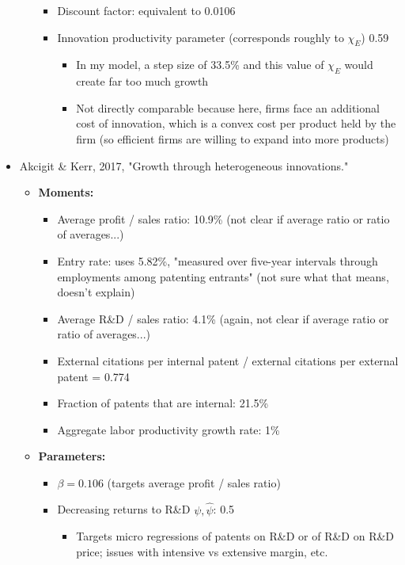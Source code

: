 \documentclass[12pt,english]{article}
\theoremstyle{remark}
\begin{document}
\begin{itemize}
\begin{itemize}
\begin{itemize}
			\item Discount factor: equivalent to 0.0106
			\item Innovation productivity parameter (corresponds roughly to $\chi_E$) 0.59
			\begin{itemize}
				\item In my model, a step size of 33.5\% and this value of $\chi_E$ would create far too much growth
				\item Not directly comparable because here, firms face an additional cost of innovation, which is a convex cost per product held by the firm (so efficient firms are willing to expand into more products)
			\end{itemize}
		\end{itemize}
	\end{itemize}
	\item Akcigit \& Kerr, 2017, "Growth through heterogeneous innovations."
	\begin{itemize}
		\item \textbf{Moments:}
		\begin{itemize}
			\item Average profit / sales ratio: 10.9\% (not clear if average ratio or ratio of averages...)
			\item Entry rate: uses 5.82\%, "measured over five-year intervals through employments among patenting entrants" (not sure what that means, doesn't explain)
			\item Average R\&D / sales ratio: 4.1\% (again, not clear if average ratio or ratio of averages...)
			\item External citations per internal patent / external citations per external patent = 0.774
			\item Fraction of patents that are internal: 21.5\%
			\item Aggregate labor productivity growth rate: 1\%
		\end{itemize}
		\item \textbf{Parameters:}
		\begin{itemize}
			\item $\beta = 0.106$ (targets average profit / sales ratio)
			\item Decreasing returns to R\&D $\psi, \hat{\psi}$: 0.5
			\begin{itemize}
				\item Targets micro regressions of patents on R\&D or of R\&D on R\&D price; issues with intensive vs extensive margin, etc.
			\end{itemize}

\end{itemize}
\end{itemize}
\end{itemize}
\end{document}
